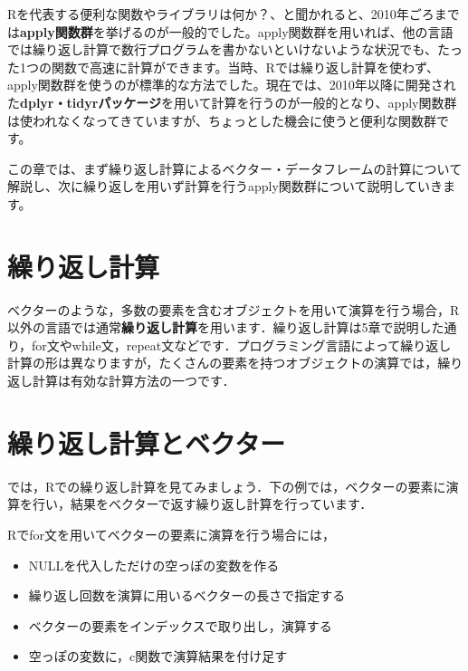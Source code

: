 \documentclass[
  letterpaper,
  DIV=11,
  numbers=noendperiod]{scrreprt}
\providecommand{\tightlist}{%
  \setlength{\itemsep}{0pt}\setlength{\parskip}{0pt}}\usepackage{longtable,booktabs,array}
\begin{document}
Rを代表する便利な関数やライブラリは何か？、と聞かれると、2010年ごろまでは\textbf{apply関数群}を挙げるのが一般的でした。apply関数群を用いれば、他の言語では繰り返し計算で数行プログラムを書かないといけないような状況でも、たった1つの関数で高速に計算ができます。当時、Rでは繰り返し計算を使わず、apply関数群を使うのが標準的な方法でした。現在では、2010年以降に開発された\textbf{dplyr・tidyrパッケージ}を用いて計算を行うのが一般的となり、apply関数群は使われなくなってきていますが、ちょっとした機会に使うと便利な関数群です。

この章では、まず繰り返し計算によるベクター・データフレームの計算について解説し、次に繰り返しを用いず計算を行うapply関数群について説明していきます。

\hypertarget{ux7e70ux308aux8fd4ux3057ux8a08ux7b97}{%
\section{繰り返し計算}\label{ux7e70ux308aux8fd4ux3057ux8a08ux7b97}}

ベクターのような，多数の要素を含むオブジェクトを用いて演算を行う場合，R以外の言語では通常\textbf{繰り返し計算}を用います．繰り返し計算は5章で説明した通り，for文やwhile文，repeat文などです．プログラミング言語によって繰り返し計算の形は異なりますが，たくさんの要素を持つオブジェクトの演算では，繰り返し計算は有効な計算方法の一つです．

\hypertarget{ux7e70ux308aux8fd4ux3057ux8a08ux7b97ux3068ux30d9ux30afux30bfux30fc}{%
\section{繰り返し計算とベクター}\label{ux7e70ux308aux8fd4ux3057ux8a08ux7b97ux3068ux30d9ux30afux30bfux30fc}}

では，Rでの繰り返し計算を見てみましょう．下の例では，ベクターの要素に演算を行い，結果をベクターで返す繰り返し計算を行っています．

Rでfor文を用いてベクターの要素に演算を行う場合には，

\begin{itemize}
\tightlist
\item
  NULLを代入しただけの空っぽの変数を作る
\item
  繰り返し回数を演算に用いるベクターの長さで指定する
\item
  ベクターの要素をインデックスで取り出し，演算する
\item
  空っぽの変数に，c関数で演算結果を付け足す
\end{itemize}
\end{document}
